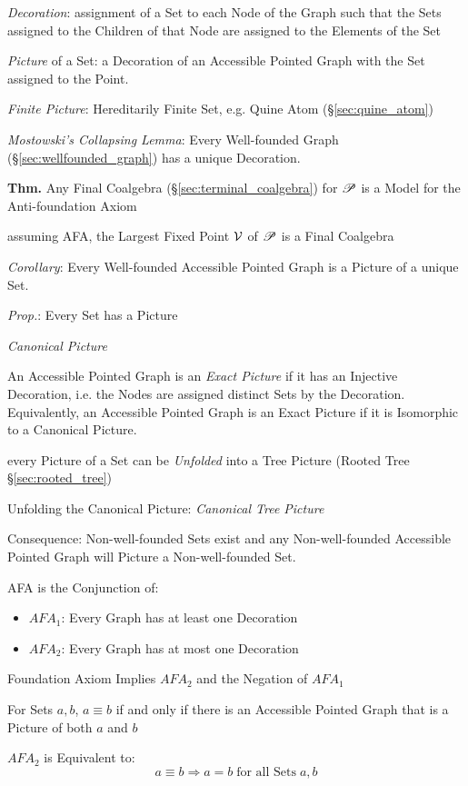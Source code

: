 \emph{Decoration}: assignment of a Set to each Node of the Graph such
that the Sets assigned to the Children of that Node are assigned to
the Elements of the Set

\emph{Picture} of a Set: a Decoration of an Accessible Pointed Graph
with the Set assigned to the Point.

\emph{Finite Picture}: Hereditarily Finite Set, e.g. Quine Atom
(\S\ref{sec:quine_atom})

\emph{Mostowski's Collapsing Lemma}: Every Well-founded Graph
(\S\ref{sec:wellfounded_graph}) has a unique Decoration.

\textbf{Thm.} Any Final Coalgebra (\S\ref{sec:terminal_coalgebra}) for
$\mathscr{P}$ is a Model for the Anti-foundation Axiom

assuming AFA, the Largest Fixed Point $\mathcal{V}$ of $\mathscr{P}$ is a Final
Coalgebra

\emph{Corollary}: Every Well-founded Accessible Pointed Graph is a
Picture of a unique Set.

\emph{Prop.}: Every Set has a Picture

\emph{Canonical Picture}

An Accessible Pointed Graph is an \emph{Exact Picture} if it has an
Injective Decoration, i.e. the Nodes are assigned distinct Sets by the
Decoration. Equivalently, an Accessible Pointed Graph is an Exact
Picture if it is Isomorphic to a Canonical Picture.

every Picture of a Set can be \emph{Unfolded} into a Tree Picture
(Rooted Tree \S\ref{sec:rooted_tree})

Unfolding the Canonical Picture: \emph{Canonical Tree Picture}

Consequence: Non-well-founded Sets exist and any Non-well-founded
Accessible Pointed Graph will Picture a Non-well-founded Set.

AFA is the Conjunction of:
\begin{itemize}
  \item $AFA_1$: Every Graph has at least one Decoration
  \item $AFA_2$: Every Graph has at most one Decoration
\end{itemize}

Foundation Axiom Implies $AFA_2$ and the Negation of $AFA_1$

For Sets $a,b$, $a \equiv b$ if and only if there is an Accessible
Pointed Graph that is a Picture of both $a$ and $b$

$AFA_2$ is Equivalent to:
\[
  a \equiv b \Rightarrow a = b \;\text{for all Sets}\; a,b
\]

